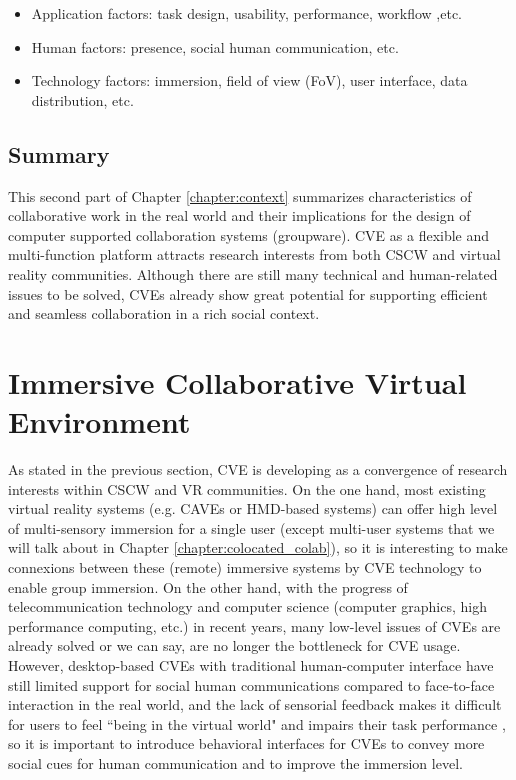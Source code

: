 \begin{itemize}
\item Application factors: task design, usability, performance, workflow ,etc.
\item Human factors: presence, social human communication, etc.
\item Technology factors: immersion, field of view (FoV), user interface, data distribution, etc.
\end{itemize}

\subsection{Summary}
This second part of Chapter \ref{chapter:context} summarizes characteristics of collaborative work in the real world and their implications for the design of computer supported collaboration systems (groupware). CVE as a flexible and multi-function platform attracts research interests from both CSCW and virtual reality communities. Although there are still many technical and human-related issues to be solved, CVEs already show great potential for supporting efficient and seamless collaboration in a rich social context.



\section{Immersive Collaborative Virtual Environment}
As stated in the previous section, CVE is developing as a convergence of research interests within CSCW and VR communities. On the one hand, most existing virtual reality systems (e.g. CAVEs or HMD-based systems) can offer high level of multi-sensory immersion for a single user (except multi-user systems that we will talk about in Chapter \ref{chapter:colocated_colab}), so it is interesting to make connexions between these (remote) immersive systems by CVE technology to enable group immersion. On the other hand, with the progress of telecommunication technology and computer science (computer graphics, high performance computing, etc.) in recent years, many low-level issues of CVEs are already solved or we can say, are no longer the bottleneck for CVE usage. However, desktop-based CVEs with traditional human-computer interface have still limited support for social human communications compared to face-to-face interaction in the real world, and the lack of sensorial feedback makes it difficult for users to feel ``being in the virtual world" and impairs their task performance \citep{Narayan2005Quantifying, Nam2008Roles}, so it is important to introduce behavioral interfaces for CVEs to convey more social cues for human communication and to improve the immersion level.

